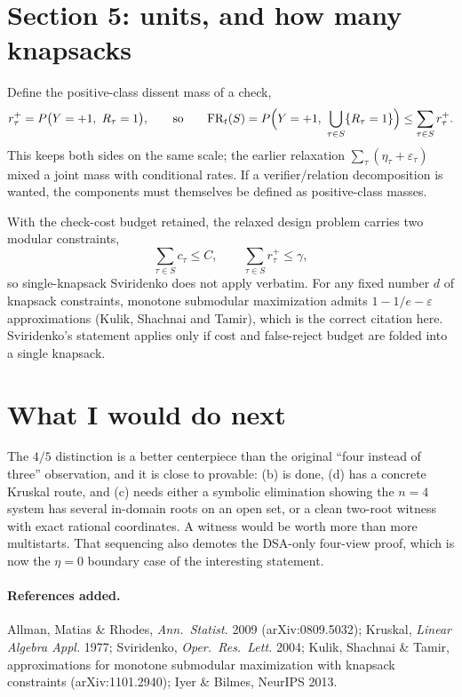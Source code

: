\documentclass[11pt]{article}
\theoremstyle{remark}
\begin{document}
\section*{Section 5: units, and how many knapsacks}

Define the positive-class dissent mass of a check,
\[
r^+_\tau=P\bigl(Y=+1,\ R_\tau=1\bigr),\qquad\text{so}\qquad \mathrm{FR}_t(S)=P\Bigl(Y=+1,\ \bigcup_{\tau\in S}\{R_\tau=1\}\Bigr)\le\sum_{\tau\in S}r^+_\tau .
\]
This keeps both sides on the same scale; the earlier relaxation $\sum_\tau(\eta_\tau+\varepsilon_\tau)$ mixed a joint mass with conditional rates. If a verifier/relation decomposition is wanted, the components must themselves be defined as positive-class masses.

With the check-cost budget retained, the relaxed design problem carries two modular constraints,
\[
\sum_{\tau\in S}c_\tau\le C,\qquad \sum_{\tau\in S}r^+_\tau\le\gamma,
\]
so single-knapsack Sviridenko does not apply verbatim. For any fixed number $d$ of knapsack constraints, monotone submodular maximization admits $1-1/e-\varepsilon$ approximations (Kulik, Shachnai and Tamir), which is the correct citation here. Sviridenko's statement applies only if cost and false-reject budget are folded into a single knapsack.

\section*{What I would do next}

The $4/5$ distinction is a better centerpiece than the original ``four instead of three'' observation, and it is close to provable: (b) is done, (d) has a concrete Kruskal route, and (c) needs either a symbolic elimination showing the $n=4$ system has several in-domain roots on an open set, or a clean two-root witness with exact rational coordinates. A witness would be worth more than more multistarts. That sequencing also demotes the DSA-only four-view proof, which is now the $\eta=0$ boundary case of the interesting statement.

\paragraph{References added.} Allman, Matias \& Rhodes, \emph{Ann.\ Statist.} 2009 (arXiv:0809.5032); Kruskal, \emph{Linear Algebra Appl.} 1977; Sviridenko, \emph{Oper.\ Res.\ Lett.} 2004; Kulik, Shachnai \& Tamir, approximations for monotone submodular maximization with knapsack constraints (arXiv:1101.2940); Iyer \& Bilmes, NeurIPS 2013.
\end{document}

